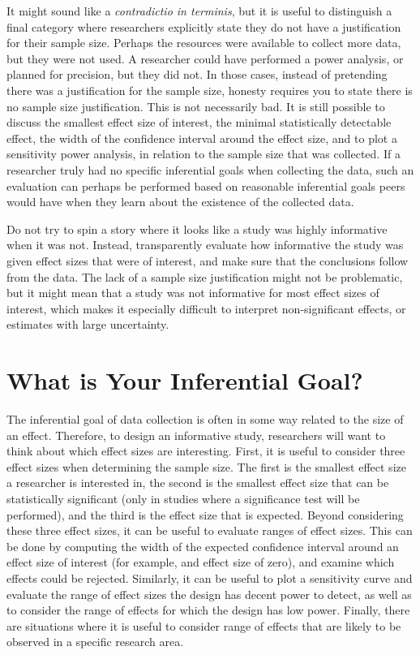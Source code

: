 \documentclass[
  english,
  ,jou, a4paper,floatsintext]{apa6}
\begin{document}
It might sound like a \emph{contradictio in terminis}, but it is useful to distinguish a final category where researchers explicitly state they do not have a justification for their sample size. Perhaps the resources were available to collect more data, but they were not used. A researcher could have performed a power analysis, or planned for precision, but they did not. In those cases, instead of pretending there was a justification for the sample size, honesty requires you to state there is no sample size justification. This is not necessarily bad. It is still possible to discuss the smallest effect size of interest, the minimal statistically detectable effect, the width of the confidence interval around the effect size, and to plot a sensitivity power analysis, in relation to the sample size that was collected. If a researcher truly had no specific inferential goals when collecting the data, such an evaluation can perhaps be performed based on reasonable inferential goals peers would have when they learn about the existence of the collected data.

Do not try to spin a story where it looks like a study was highly informative when it was not. Instead, transparently evaluate how informative the study was given effect sizes that were of interest, and make sure that the conclusions follow from the data. The lack of a sample size justification might not be problematic, but it might mean that a study was not informative for most effect sizes of interest, which makes it especially difficult to interpret non-significant effects, or estimates with large uncertainty.

\hypertarget{what-is-your-inferential-goal}{%
\section{What is Your Inferential Goal?}\label{what-is-your-inferential-goal}}

The inferential goal of data collection is often in some way related to the size of an effect. Therefore, to design an informative study, researchers will want to think about which effect sizes are interesting. First, it is useful to consider three effect sizes when determining the sample size. The first is the smallest effect size a researcher is interested in, the second is the smallest effect size that can be statistically significant (only in studies where a significance test will be performed), and the third is the effect size that is expected. Beyond considering these three effect sizes, it can be useful to evaluate ranges of effect sizes. This can be done by computing the width of the expected confidence interval around an effect size of interest (for example, and effect size of zero), and examine which effects could be rejected. Similarly, it can be useful to plot a sensitivity curve and evaluate the range of effect sizes the design has decent power to detect, as well as to consider the range of effects for which the design has low power. Finally, there are situations where it is useful to consider range of effects that are likely to be observed in a specific research area.
\end{document}
